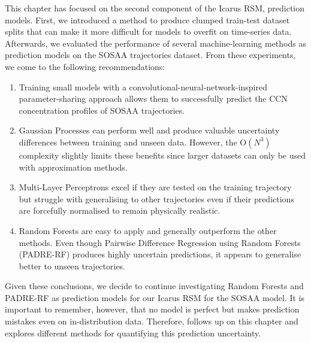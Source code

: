 This chapter has focused on the second component of the Icarus RSM, prediction models. First, we introduced a method to produce clumped train-test dataset splits that can make it more difficult for models to overfit on time-series data. Afterwards, we evaluated the performance of several machine-learning methods as prediction models on the SOSAA trajectories dataset. From these experiments, we come to the following recommendations:

\begin{enumerate}
    \item Training small models with a convolutional-neural-network-inspired parameter-sharing approach allows them to successfully predict the CCN concentration profiles of SOSAA trajectories.
    \item Gaussian Processes can perform well and produce valuable uncertainty differences between training and unseen data. However, the $\text{O}(N^3)$ complexity slightly limits these benefits since larger datasets can only be used with approximation methods.
    \item Multi-Layer Perceptrons excel if they are tested on the training trajectory but struggle with generalising to other trajectories even if their predictions are forcefully normalised to remain physically realistic.
    \item Random Forests are easy to apply and generally outperform the other methods. Even though Pairwise Difference Regression using Random Forests (PADRE-RF) produces highly uncertain predictions, it appears to generalise better to unseen trajectories.
\end{enumerate}

\noindent Given these conclusions, we decide to continue investigating Random Forests and PADRE-RF as prediction models for our Icarus RSM for the SOSAA model. It is important to remember, however, that no model is perfect but makes prediction mistakes even on in-distribution data. Therefore,  follows up on this chapter and explores different methods for quantifying this prediction uncertainty.
